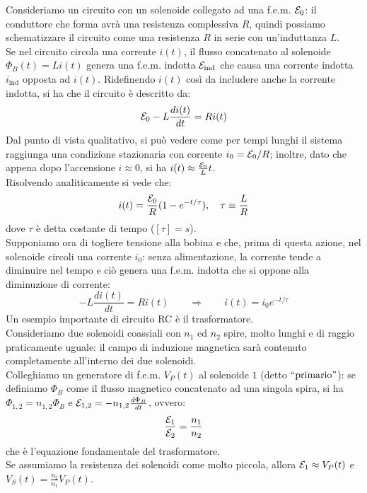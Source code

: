 Consideriamo un circuito con un solenoide collegato ad una f.e.m. $ \mathcal{E}_0 $: il conduttore che forma avrà una resistenza complessiva $ R $, quindi possiamo schematizzare il circuito come una resistenza $ R $ in serie con un'induttanza $ L $. \\ 
Se nel circuito circola una corrente $ i(t) $, il flusso concatenato al solenoide $ \Phi_B(t) = Li(t) $ genera una f.e.m. indotta $ \mathcal{E}_{\text{ind}} $ che causa una corrente indotta $ i_{\text{ind}} $ opposta ad $ i(t) $. Ridefinendo $ i(t) $ così da includere anche la corrente indotta, si ha che il circuito è descritto da:
\begin{equation}
	\mathcal{E}_0 - L \frac{di(t)}{dt} = Ri(t)
	\label{eq:29}
\end{equation}
Dal punto di vista qualitativo, si può vedere come per tempi lunghi il sistema raggiunga una condizione stazionaria con corrente $ i_0 = \mathcal{E}_0 / R $; inoltre, dato che appena dopo l'accensione $ i \approx 0 $, si ha $ i(t) \approx \frac{\mathcal{E}_0}{L} t $. \\ 
%
Risolvendo analiticamente si vede che:
\begin{equation}
	i(t) = \frac{\mathcal{E}_0}{R} (1 - e^{-t/\tau}), \quad \tau \equiv \frac{L}{R}
	\label{eq:30}
\end{equation}
dove $ \tau $ è detta costante di tempo ($ [\tau] = s $). \\ 
%
Supponiamo ora di togliere tensione alla bobina e che, prima di questa azione, nel solenoide circoli una corrente $ i_0 $: senza alimentazione, la corrente tende a diminuire nel tempo e ciò genera una f.e.m. indotta che si oppone alla diminuzione di corrente:
\begin{equation}
	-L \frac{di(t)}{dt} = Ri(t) \qquad\Longrightarrow\qquad i(t) = i_0 e^{-t/\tau}
	\label{eq:31}
\end{equation}
%
Un esempio importante di circuito RC è il trasformatore. \\ 
%
Consideriamo due solenoidi coassiali con $ n_1 $ ed $ n_2 $ spire, molto lunghi e di raggio praticamente uguale: il campo di induzione magnetica sarà contenuto completamente all'interno dei due solenoidi. \\ 
%
Colleghiamo un generatore di f.e.m. $ V_P(t) $ al solenoide $ 1 $ (detto $ ``\text{primario}" $): se definiamo $ \Phi_B $ come il flusso magnetico concatenato ad una singola spira, si ha $ \Phi_{1,2} = n_{1,2} \Phi_B $ e $ \mathcal{E}_{1,2} = - n_{1,2} \frac{d\Phi_B}{dt} $, ovvero:
\begin{equation}
	\frac{\mathcal{E}_1}{\mathcal{E}_2} = \frac{n_1}{n_2}
	\label{eq:32}
\end{equation}
che è l'equazione fondamentale del trasformatore. \\ 
%
Se assumiamo la resistenza dei solenoidi come molto piccola, allora $ \mathcal{E}_1 \approx V_P(t) $ e $ V_S(t) = \frac{n_2}{n_1}V_P(t) $.

